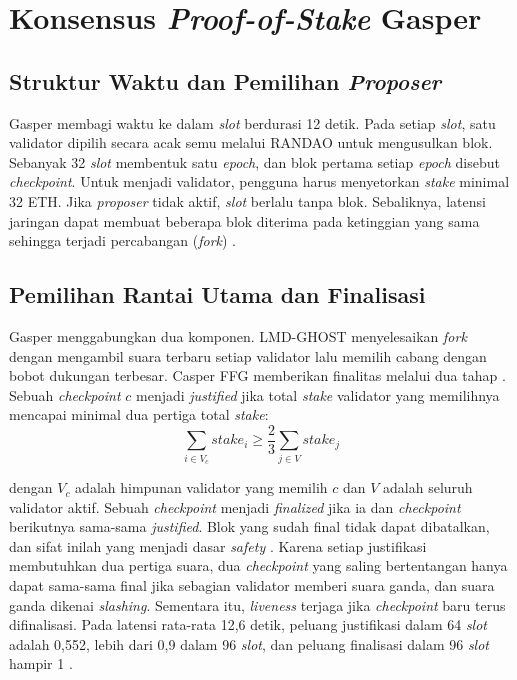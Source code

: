 \section{Konsensus \textit{Proof-of-Stake} Gasper}
\label{sec:gasper}

\subsection{Struktur Waktu dan Pemilihan \textit{Proposer}}
Gasper membagi waktu ke dalam \textit{slot} berdurasi 12 detik. Pada setiap \textit{slot}, satu validator dipilih secara acak semu melalui RANDAO untuk mengusulkan blok. Sebanyak 32 \textit{slot} membentuk satu \textit{epoch}, dan blok pertama setiap \textit{epoch} disebut \textit{checkpoint}. Untuk menjadi validator, pengguna harus menyetorkan \textit{stake} minimal 32 ETH. Jika \textit{proposer} tidak aktif, \textit{slot} berlalu tanpa blok. Sebaliknya, latensi jaringan dapat membuat beberapa blok diterima pada ketinggian yang sama sehingga terjadi percabangan (\textit{fork}) \parencite{laneve2025stochastic}.

\subsection{Pemilihan Rantai Utama dan Finalisasi}
Gasper menggabungkan dua komponen. LMD-GHOST menyelesaikan \textit{fork} dengan mengambil suara terbaru setiap validator lalu memilih cabang dengan bobot dukungan terbesar. Casper FFG memberikan finalitas melalui dua tahap \parencite{laneve2025stochastic}. Sebuah \textit{checkpoint} $c$ menjadi \textit{justified} jika total \textit{stake} validator yang memilihnya mencapai minimal dua pertiga total \textit{stake}:
\begin{equation}
\sum_{i \in V_c} \textit{stake}_i \geq \frac{2}{3} \sum_{j \in V} \textit{stake}_j
\label{eq:justified}
\end{equation}

\noindent dengan $V_c$ adalah himpunan validator yang memilih $c$ dan $V$ adalah seluruh validator aktif. Sebuah \textit{checkpoint} menjadi \textit{finalized} jika ia dan \textit{checkpoint} berikutnya sama-sama \textit{justified}. Blok yang sudah final tidak dapat dibatalkan, dan sifat inilah yang menjadi dasar \textit{safety} \parencite{laneve2025stochastic}. Karena setiap justifikasi membutuhkan dua pertiga suara, dua \textit{checkpoint} yang saling bertentangan hanya dapat sama-sama final jika sebagian validator memberi suara ganda, dan suara ganda dikenai \textit{slashing}. Sementara itu, \textit{liveness} terjaga jika \textit{checkpoint} baru terus difinalisasi. Pada latensi rata-rata 12,6 detik, peluang justifikasi dalam 64 \textit{slot} adalah 0,552, lebih dari 0,9 dalam 96 \textit{slot}, dan peluang finalisasi dalam 96 \textit{slot} hampir 1 \parencite{laneve2025stochastic}.

